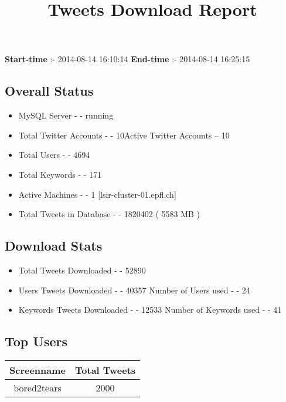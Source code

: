 \documentclass{article}\usepackage[T1]{fontenc}
\begin{document}
\title{\textbf{Tweets Download Report}}
               \date{}
                \maketitle
               \centerline{\textbf{Start-time} :- 2014-08-14 16:10:14 \hspace{40pt} \textbf{End-time} :- 2014-08-14 16:25:15}               \subsection*{Overall Status}                \begin{itemize}                \item MySQL Server - - running               \item Total Twitter Accounts - - 10\newline Active Twitter Accounts -- 10               \item Total Users - - 4694               \item Total Keywords - - 171               \item Active Machines - - 1 [lsir-cluster-01.epfl.ch]               \item Total Tweets in Database - - 1820402 ( 5583 MB )               \end{itemize}               \subsection*{Download Stats}                \begin{itemize}                \item Total Tweets Downloaded - - 52890               \item Users Tweets Downloaded - - 40357 \newline Number of Users used - - 24               \item Keywords Tweets Downloaded - - 12533 \newline Number of Keywords used - - 41              \end{itemize}              \subsection*{Top Users}\begin{tabular}{|c|c|}         \hline         Screenname & Total Tweets \\ 
 \hline
bored2tears & 2000\\ 
 \hline

\end{tabular}
\end{document}
